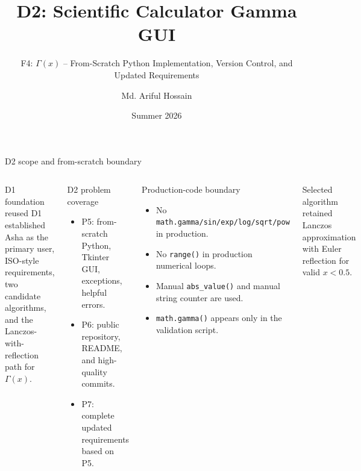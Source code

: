 \documentclass[10pt,aspectratio=169]{beamer}
\title{D2: Scientific Calculator Gamma GUI}
\subtitle{F4: $\Gamma(x)$ -- From-Scratch Python Implementation, Version Control, and Updated Requirements}
\author{Md. Ariful Hossain}
\institute{SOEN 6011: Software Engineering Processes}
\date{Summer 2026}
\newcommand{\smallnote}[1]{\vspace{0.2em}{\scriptsize\textcolor{linegray}{#1}}}
\begin{document}
\begin{frame}
\titlepage
\end{frame}

\begin{frame}{D2 scope and from-scratch boundary}
\scriptsize
\begin{columns}[T,onlytextwidth]
\begin{block}{D1 foundation reused}
D1 established Asha as the primary user, ISO-style requirements, two candidate algorithms, and the Lanczos-with-reflection path for $\Gamma(x)$.
\end{block}
\begin{block}{D2 problem coverage}
\begin{itemize}\itemsep0.2em
  \item P5: from-scratch Python, Tkinter GUI, exceptions, helpful errors.
  \item P6: public repository, README, and high-quality commits.
  \item P7: complete updated requirements based on P5.
\end{itemize}
\end{block}
\begin{block}{Production-code boundary}
\begin{itemize}\itemsep0.25em
  \item No \texttt{math.gamma/sin/exp/log/sqrt/pow} in production.
  \item No \texttt{range()} in production numerical loops.
  \item Manual \texttt{abs\_value()} and manual string counter are used.
  \item \texttt{math.gamma()} appears only in the validation script.
\end{itemize}
\end{block}
\begin{block}{Selected algorithm retained}
Lanczos approximation with Euler reflection for valid $x<0.5$.
\end{block}
\end{columns}
\vfill\smallnote{Sources: [1], [2], [3], [4].}
\end{frame}
\end{document}
